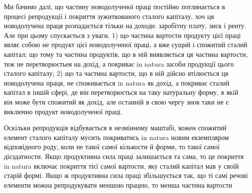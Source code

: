 Ми бачимо далі, що частину новодолученої праці постійно поглинається
в процесі репродукції і покриття зужиткованого сталого капіталу, хоч ця новодолучена
праця розпадається тільки на доходи: заробітну плату, зиск і ренту.
Але при цьому спускається з уваги, 1) що частина вартости продукту цієї
праці являє собою не продукт цієї новодолученої праці, а вже сущий і спожитий
сталий капітал; що тому та частина продуктів, що в ній виявляється
ця частина вартости, теж не перетворюєтьея на дохід, а покриває in natura
засоби продукції цього сталого капіталу; 2) що та частина вартости, що в ній
дійсно втілюється ця новодолучена праця, не споживається in natura як дохід,
а покриває сталий капітал в іншій сфері, де він перетворюється на таку натуральну
форму, в якій він може бути спожитий як дохід, але останній в свою
чергу знов таки не є виключно продукт новодолученої праці.

Оскільки репродукція відбувається в незмінному маштабі, кожен спожитий
елемент сталого капіталу мусить покриватись in natura новим екземпляром відповідного роду, коли не
такої самої кількости й форми, то такої самої дієздатности.
Якщо продуктивна сила праці залишається та сама, то це покриття in
natura включає покриття тієї самої вартости, яку сталий капітал мав у своїй
старій формі. Якщо ж продуктивна сила праці збільшується так, що ті самі
речові елементи можна репродукувати меншою працею, то менша частина вартости
\parbreak{}  %
